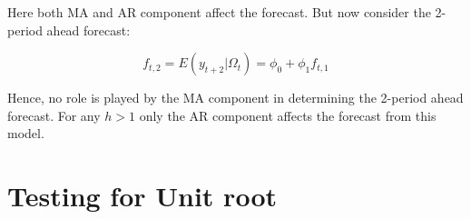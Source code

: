 \documentclass[]{book}
\theoremstyle{definition}
\theoremstyle{definition}
\theoremstyle{definition}
\theoremstyle{remark}
\begin{document}
Here both MA and AR component affect the forecast. But now consider the
2-period ahead forecast:

\[f_{t,2} = E(y_{t+2}|\Omega_t) = \phi_0 + \phi_1 f_{t,1}\]

Hence, no role is played by the MA component in determining the 2-period
ahead forecast. For any \(h>1\) only the AR component affects the
forecast from this model.

\hypertarget{testing-for-unit-root}{%
\section{Testing for Unit root}\label{testing-for-unit-root}}


\end{document}
